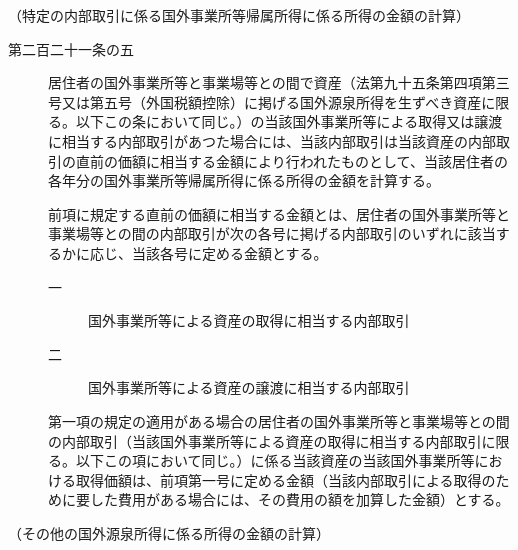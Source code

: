 \documentclass[twocolumn,a4j,10pt]{ltjtarticle}
\begin{document}
\noindent\hspace{10pt}（特定の内部取引に係る国外事業所等帰属所得に係る所得の金額の計算）
\begin{description}
\item[第二百二十一条の五]居住者の国外事業所等と事業場等との間で資産（法第九十五条第四項第三号又は第五号（外国税額控除）に掲げる国外源泉所得を生ずべき資産に限る。以下この条において同じ。）の当該国外事業所等による取得又は譲渡に相当する内部取引があつた場合には、当該内部取引は当該資産の内部取引の直前の価額に相当する金額により行われたものとして、当該居住者の各年分の国外事業所等帰属所得に係る所得の金額を計算する。
\item[]前項に規定する直前の価額に相当する金額とは、居住者の国外事業所等と事業場等との間の内部取引が次の各号に掲げる内部取引のいずれに該当するかに応じ、当該各号に定める金額とする。
\begin{description}
\item[一]国外事業所等による資産の取得に相当する内部取引
\item[二]国外事業所等による資産の譲渡に相当する内部取引
\end{description}
\item[]第一項の規定の適用がある場合の居住者の国外事業所等と事業場等との間の内部取引（当該国外事業所等による資産の取得に相当する内部取引に限る。以下この項において同じ。）に係る当該資産の当該国外事業所等における取得価額は、前項第一号に定める金額（当該内部取引による取得のために要した費用がある場合には、その費用の額を加算した金額）とする。
\end{description}
\noindent\hspace{10pt}（その他の国外源泉所得に係る所得の金額の計算）
\end{document}
